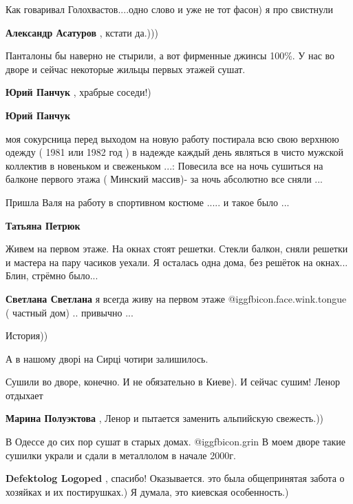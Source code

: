 \begin{itemize}
Как говаривал Голохвастов....одно слово и уже не тот фасон) я про свистнули

\textbf{Александр Асатуров} , кстати да.)))


Панталоны бы наверно не стырили, а вот фирменные джинсы 100\%. У нас во дворе и
сейчас некоторые жильцы первых этажей сушат.

\begin{itemize} %
\textbf{Юрий Панчук} , храбрые соседи!)

\textbf{Юрий Панчук} 

моя сокурсница перед выходом на новую работу постирала всю свою верхнюю одежду
( 1981 или 1982 год ) в надежде каждый день являться в чисто мужской коллектив
в новеньком и свеженьком ...: Повесила все на ночь сушиться на балконе первого
этажа ( Минский массив)- за ночь абсолютно все сняли ...

Пришла Валя на работу в спортивном костюме ..... и такое было ...

\textbf{Татьяна Петрюк} 

Живем на первом этаже. На окнах стоят решетки. Стекли балкон, сняли решетки и
мастера на пару часиков уехали. Я осталась одна дома, без решёток на окнах...
Блин, стрёмно было...


\textbf{Светлана Светлана} я всегда живу на первом этаже  @igg{fbicon.face.wink.tongue} ( частный дом) .. привычно ...

\end{itemize} %


История))

А в нашому дворі на Сирці чотири залишилось.


Сушили во дворе, конечно. И не обязательно в Киеве).
И сейчас сушим! Ленор отдыхает

\textbf{Марина Полуэктова} , Ленор и пытается заменить альпийскую свежесть.))


В Одессе до сих пор сушат в старых домах.  @igg{fbicon.grin} В моем дворе такие сушилки украли и
сдали в металлолом в начале 2000г.

\begin{itemize} %
\textbf{Defektolog Logoped} , спасибо! Оказывается. это была общепринятая забота о хозяйках и их постирушках.) Я думала, это киевская особенность.)


\end{itemize}
\end{itemize}
